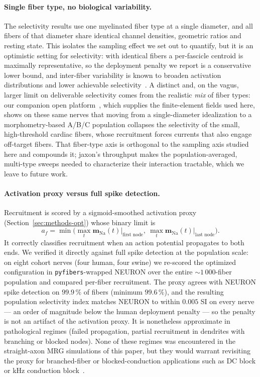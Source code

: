 \paragraph{Single fiber type, no biological variability.}
The selectivity results use one myelinated fiber type at a single
diameter, and all fibers of that diameter share identical channel
densities, geometric ratios and resting state.  This isolates the
sampling effect we set out to quantify, but it is an optimistic setting
for selectivity: with identical fibers a per-fascicle centroid is
maximally representative, so the deployment penalty we report is a
conservative lower bound, and inter-fiber variability is known to
broaden activation distributions and lower achievable
selectivity~\cite{aristovich2021}.  A distinct and, on the vagus, larger
limit on deliverable selectivity comes from the realistic \emph{mix} of
fiber types: our companion open platform~\cite{lung2026golgi},
which supplies the finite-element fields used here, shows on these same
nerves that moving from a single-diameter idealization to a morphometry-based
A/B/C population collapses the selectivity of the small, high-threshold
cardiac fibers, whose recruitment forces currents that also engage
off-target fibers.  That fiber-type axis is orthogonal to the sampling
axis studied here and compounds it; jaxon's throughput makes the
population-averaged, multi-type sweeps needed to characterize their
interaction tractable, which we leave to future work.

\paragraph{Activation proxy versus full spike detection.}
Recruitment is scored by a sigmoid-smoothed activation proxy
(Section~\ref{sec:methods-opt}) whose binary limit is
\begin{equation*}
  a_f = \min\!\bigl(\max_t \mathbf{m}_{\mathrm{Na}}(t)\big|_{\text{first node}},\
                    \max_t \mathbf{m}_{\mathrm{Na}}(t)\big|_{\text{last node}}\bigr).
\end{equation*}
It correctly classifies recruitment when an action potential
propagates to both ends.  We verified it directly against full spike
detection at the population scale: on eight cohort nerves (four human,
four swine) we re-scored the optimized configuration in
\texttt{pyfibers}-wrapped NEURON over the entire ${\sim}1\,000$-fiber
population and compared per-fiber recruitment.  The proxy agrees with
NEURON spike detection on $99.9\,\%$ of fibers (minimum $99.6\,\%$), and
the resulting population selectivity index matches NEURON to within
$0.005$ SI on every nerve --- an order of magnitude below the human
deployment penalty --- so the penalty is not an artifact of the
activation proxy.  It is nonetheless approximate in pathological regimes
(failed propagation, partial recruitment in dendrites with branching
or blocked nodes).  None of these regimes was encountered in the
straight-axon MRG simulations of this paper, but they would warrant
revisiting the proxy for branched-fiber or blocked-conduction
applications such as DC block or kHz conduction
block~\cite{kilgore2014block}.

